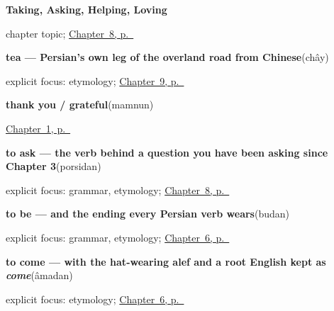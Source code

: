 \noindent\begin{minipage}[t]{\linewidth}
\raggedright
\textbf{Taking, Asking, Helping, Loving}\par
\footnotesize chapter topic; \hyperref[ch:fa-doing-verbs]{Chapter~8, p.~\pageref*{ch:fa-doing-verbs}}
\end{minipage}\par\smallskip

\noindent\begin{minipage}[t]{\linewidth}
\raggedright
\textbf{tea — Persian's own leg of the overland road from Chinese}\enspace\emph{}\enspace(chây)\par
\footnotesize explicit focus: etymology; \hyperref[ch:fa-please-requests]{Chapter~9, p.~\pageref*{ch:fa-please-requests}}
\end{minipage}\par\smallskip

\noindent\begin{minipage}[t]{\linewidth}
\raggedright
\textbf{thank you / grateful}\enspace\emph{}\enspace(mamnun)\par
\footnotesize \hyperref[ch:persian-greetings]{Chapter~1, p.~\pageref*{ch:persian-greetings}}
\end{minipage}\par\smallskip

\noindent\begin{minipage}[t]{\linewidth}
\raggedright
\textbf{to ask — the verb behind a question you have been asking since Chapter 3}\enspace\emph{}\enspace(porsidan)\par
\footnotesize explicit focus: grammar, etymology; \hyperref[ch:fa-doing-verbs]{Chapter~8, p.~\pageref*{ch:fa-doing-verbs}}
\end{minipage}\par\smallskip

\noindent\begin{minipage}[t]{\linewidth}
\raggedright
\textbf{to be — and the ending every Persian verb wears}\enspace\emph{}\enspace(budan)\par
\footnotesize explicit focus: grammar, etymology; \hyperref[ch:fa-core-verbs]{Chapter~6, p.~\pageref*{ch:fa-core-verbs}}
\end{minipage}\par\smallskip

\noindent\begin{minipage}[t]{\linewidth}
\raggedright
\textbf{to come — with the hat-wearing alef and a root English kept as \emph{come}}\enspace\emph{}\enspace(âmadan)\par
\footnotesize explicit focus: etymology; \hyperref[ch:fa-core-verbs]{Chapter~6, p.~\pageref*{ch:fa-core-verbs}}
\end{minipage}\par\smallskip

